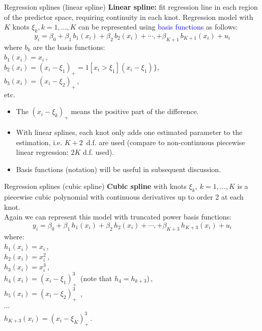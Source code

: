 \documentclass{beamer}
\begin{document}
\begin{frame}{Regression splines (linear spline)}
\textbf{Linear spline:} fit regression line in each region of the predictor space, requiring continuity in each knot. Regression model with $K$ knots $\xi_k, k=1,\dots, K$ can be represented using \textcolor{blue}{basis functions} as follows:
$$y_i = \beta_0 + \beta_1 \, b_1 (x_i) + \beta_2 \, b_2 (x_i) + \cdots, + \beta_{K+1} \, b_{K+1} (x_i) + u_i  $$
where $b_k$ are the basis functions:\\
\smallskip
\qquad $b_1 (x_i) = x_i$\,,\\
\qquad $b_2 (x_i) = (x_i-\xi_1)_{+} = 1[x_i > \xi_1](x_i-\xi_1)\}$,\\
\qquad $b_3 (x_i) = (x_i-\xi_2)_{+}$\,, \\ \qquad etc.\\
\medskip
\begin{itemize}
    \item The $(x_i-\xi_k)_{+}$ means the positive part of the difference.
    \smallskip
    \item With linear splines, each knot only adds one estimated parameter to the estimation, i.e. $K\!+\!2\,$ d.f. are used (compare to non-continuous piecewise linear regression: $2K$ d.f. used).
    \smallskip
    \item Basis functions (notation) will be useful in subsequent discussion.
\end{itemize}
\end{frame}
\begin{frame}{Regression splines (cubic spline)}
\textbf{Cubic spline} with knots $\xi_k,~k=1,\dots, K$ is a piecewise cubic polynomial with continuous derivatives up to order 2 at each knot.\\
\medskip
Again we can represent this model with truncated power basis functions:
$$y_i = \beta_0 + \beta_1 \, h_1 (x_i) + \beta_2 \, h_2 (x_i) + \cdots, + \beta_{K+3} \, h_{K+3} (x_i) + u_i  $$
where:\\
\smallskip
\qquad $h_1 (x_i) = x_i$\,,\\
\smallskip
\qquad $h_2 (x_i) = x_i^2$\,,\\
\smallskip
\qquad $h_3 (x_i) = x_i^3$\,,\\
\smallskip
\qquad $h_4 (x_i) = (x_i-\xi_1)_{+}^3 \,$ \qquad (note that $h_4 = h_{k+3}$)\,,\\
\smallskip
\qquad $h_5 (x_i) = (x_i-\xi_2)_{+}^3 \,$ ,\\
\qquad $\cdots$ \\
\qquad $h_{K+3} (x_i) = (x_i-\xi_K)_{+}^3 \,$.\\
\medskip
\end{frame}
\end{document}
